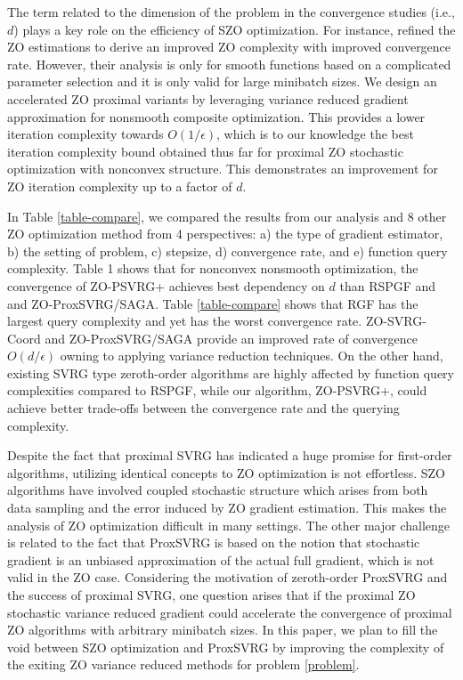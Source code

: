 The term related to the dimension of the problem in the convergence studies (i.e., $d$) plays a key role on the efficiency of SZO optimization. For instance, \cite{ji2019improved} refined the ZO estimations to derive an improved ZO complexity with improved convergence rate. However, their analysis is only for smooth functions based on a complicated parameter selection and it is only valid for large minibatch sizes.
We design an accelerated ZO proximal variants by leveraging variance reduced gradient approximation for nonsmooth composite optimization. This provides a lower iteration complexity towards $O(1/\epsilon )$, which is to our knowledge the best iteration complexity bound obtained thus far for proximal ZO stochastic optimization with nonconvex structure. This demonstrates an improvement for ZO iteration complexity up to a factor of ${d}$.

In Table \ref{table-compare}, we compared the results from our analysis and 8 other ZO optimization method from 4 perspectives: a) the type of gradient estimator, b) the setting of problem, c) stepsize, d) convergence rate, and e) function query complexity. Table 1 shows that for nonconvex nonsmooth optimization, the convergence of ZO-PSVRG+
achieves best dependency on $d$ than RSPGF and and ZO-ProxSVRG/SAGA. Table \ref{table-compare} shows that RGF has the largest query complexity and yet has the worst convergence rate. ZO-SVRG-Coord and ZO-ProxSVRG/SAGA provide an improved rate of convergence $O(d/\epsilon )$ owning to applying variance reduction techniques. On the other hand, existing SVRG type zeroth-order algorithms are highly affected by function query complexities compared to RSPGF, while our algorithm, ZO-PSVRG+, could achieve better trade-offs between the convergence rate and the querying complexity.

Despite the fact that proximal SVRG has indicated a huge promise for first-order algorithms, utilizing identical concepts to ZO optimization is not effortless. SZO algorithms have involved coupled stochastic structure which arises from both data sampling and the error induced by ZO gradient estimation. This makes the analysis of ZO optimization difficult in many settings. The other major challenge is related to the fact that ProxSVRG is based on the notion that stochastic gradient is an unbiased approximation of the actual full gradient, which is not valid in the ZO case. 
Considering the motivation of zeroth-order ProxSVRG and the success of proximal SVRG, one
question arises that if the proximal ZO stochastic variance reduced gradient could accelerate the convergence of proximal ZO algorithms with arbitrary minibatch sizes.
In this paper, we plan to fill the void between
SZO optimization and ProxSVRG by improving the complexity of the exiting ZO variance reduced methods for problem \eqref{problem}.


